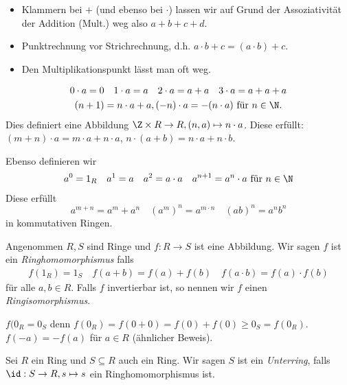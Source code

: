 \begin{convention}
	\begin{itemize}
		\item Klammern bei $+$ (und ebenso bei $\cdot$) lassen wir auf Grund der Assoziativität der Addition (Mult.) weg also $a+b+c+d$.
		\item Punktrechnung vor Strichrechnung, d.h. $a\cdot b +c = (a\cdot b) + c$.
		\item Den Multiplikationspunkt lässt man oft weg.
	\end{itemize}
\end{convention}

\begin{notation}
	\begin{gather*}
		0\cdot a = 0 \quad 1\cdot a = a \quad 2\cdot a = a+a \quad 3\cdot a = a+a+a\\
		(n+1) = n\cdot a + a, (-n) \cdot a = -(n\cdot a) \text{ für } n \in \N
	.\end{gather*}
	Dies definiert eine Abbildung $\Z \times R \to R, (n,a) \mapsto n\cdot a$.
	Diese erfüllt:  $(m+n) \cdot a = m\cdot a + n \cdot a$, $n \cdot (a+b) = n\cdot a + n \cdot b$.

	Ebenso definieren wir
	\begin{gather*}
		a^{0} = 1_{R} \quad a^{1} = a \quad a^2 = a\cdot a \quad a^{n+1} = a^{n} \cdot a \text{ für } n \in \N
	\end{gather*}
	Diese erfüllt
	\[
		a^{m+n} = a^{m} + a^{n} \quad (a^{m})^{n} = a^{m\cdot n} \quad (ab)^{n} = a^{n} b^{n}
	\] 
	in kommutativen Ringen.
\end{notation}

\begin{definition}
	Angenommen $R,S$ sind Ringe und $f: R \to S$ ist eine Abbildung.
	Wir sagen $f$ ist ein \emph{Ringhomomorphismus} falls
	\begin{gather*}
		f(1_{R}) = 1_{S} \quad f(a+b) = f(a) + f(b) \quad f(a\cdot b) = f(a) \cdot f(b)
	\end{gather*}
	für alle $a,b \in R$.
	Falls $f$ invertierbar ist, so nennen wir $f$ einen \emph{Ringisomorphismus}.
\end{definition}

\begin{remark}
	$f(0_{R} = 0_{S}$ denn $f(0_{R}) = f(0+0) = f(0) + f(0) \geq 0_{S} = f(0_{R})$.\\
	$f(-a) = -f(a)$ für $a \in R$ (ähnlicher Beweis).
\end{remark}

\begin{definition}
	Sei $R$ ein Ring und $S \subseteq R$ auch ein Ring. 
	Wir sagen $S$ ist ein \emph{Unterring}, falls $\id: S \to R, s \mapsto s$ ein Ringhomomorphismus ist.
\end{definition}

